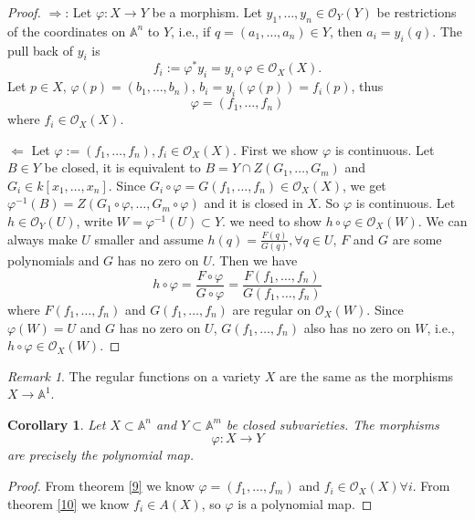 \documentclass{amsart}
\theoremstyle{plain}
\newtheorem{corollary}{Corollary}
\theoremstyle{definition}
\theoremstyle{remark}
\newtheorem*{remark}{Remark}
\numberwithin{equation}{section}
\begin{document}
\begin{proof}
	$ \Rightarrow $: Let $ \varphi :X\to Y $ be a morphism. Let $ y_1,\dots, y_n \in \mathcal{O}_Y(Y)$ be restrictions of the coordinates on $ \mathbb{A}^n $ to $ Y $, i.e., if $ q=(a_1,\dots,a_n)\in Y $, then $ a_i=y_i(q) $. The pull back of $ y_i $ is
	\begin{equation}
	f_i:=\varphi^\ast y_i=y_i\circ \varphi \in \mathcal{O}_X(X).
	\end{equation}
	Let $ p\in X $, $ \varphi(p)=(b_1,\dots,b_n) $, $ b_i=y_i(\varphi(p))=f_i(p) $, thus
	$$
	\varphi= (f_1,\dots,f_n)
	$$
	where $ f_i\in \mathcal{O}_X(X) $.

	$ \Leftarrow $ Let $ \varphi :=(f_1,\dots,f_n),f_i\in \mathcal{O}_X(X) $. First we show $ \varphi  $  is continuous. Let $ B\in Y $ be closed, it is equivalent to $ B=Y\cap Z(G_1,\dots,G_m) $ and $ G_i\in k[x_1,\dots,x_n] $. Since
	$ G_i\circ \varphi = G(f_1,\dots,f_n)\in \mathcal{O}_X(X) $, we get $ \varphi^{-1}(B)=Z(G_1\circ \varphi,\dots,G_m\circ\varphi) $ and it is closed in $ X $. So $ \varphi $ is continuous. Let $ h\in \mathcal{O}_Y(U) $, write $ W=\varphi^{-1}(U)\subset Y $. we need to show $ h\circ \varphi \in \mathcal{O}_X(W) $. We can always make $ U $ smaller and assume $ h(q)=\frac{F(q)}{G(q)} ,\forall q\in U$, $ F $ and $ G $ are some polynomials and $ G $ has no zero on $ U $. Then we have
	\begin{equation}
	h\circ \varphi =\frac{F\circ \varphi}{G\circ \varphi}=\frac{F(f_1,\dots,f_n)}{G(f_1,\dots,f_n)}
	\end{equation}
	where $ F(f_1,\dots,f_n) $ and $ G(f_1,\dots,f_n) $ are regular on $ \mathcal{O}_X(W) $. Since $ \varphi(W)=U $ and $ G $ has no zero on $ U $, $ G(f_1,\dots,f_n) $ also has no zero on $ W $, i.e., $ h\circ \varphi\in \mathcal{O}_X(W) $.
\end{proof}
\begin{remark}
	The regular functions on a variety $ X $ are the same as the morphisms $ X\to \mathbb{A}^1 $.
\end{remark}
\begin{corollary}
	Let $ X\subset \mathbb{A}^n $ and $ Y\subset \mathbb{A}^m $ be closed subvarieties. The morphisms
	$$
	\varphi:X\to Y
	$$
	are precisely the polynomial map.
\end{corollary}
\begin{proof}
 From theorem \ref{9} we know $ \varphi=(f_1,\dots,f_m) $ and $ f_i\in \mathcal{O}_X(X) \forall i$. From theorem \ref{10} we know $ f_i\in A(X) $, so $ \varphi $ is a polynomial map.
\end{proof}
\end{document}
